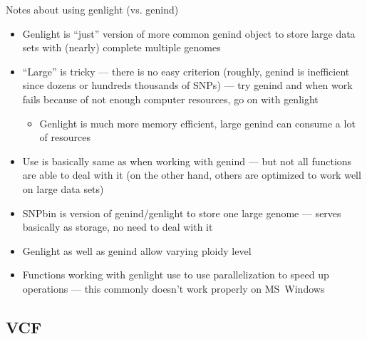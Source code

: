 \documentclass[compress, xelatex, 11pt, xcolor=svgnames, aspectratio=169, url={hyphens, lowtilde}]{beamer}
\begin{document}
\begin{frame}{Notes about using genlight (vs. genind)}
	\begin{itemize}
		\item Genlight is \enquote{just} version of more common genind object to store large data sets with (nearly) complete multiple genomes
		\item \enquote{Large} is tricky --- there is no easy criterion (roughly, genind is inefficient since dozens or hundreds thousands of SNPs) --- try genind and when work fails because of not enough computer resources, go on with genlight
		\begin{itemize}
			\item Genlight is much more memory efficient, large genind can consume a lot of resources
		\end{itemize}
		\item Use is basically same as when working with genind --- but not all functions are able to deal with it (on the other hand, others are optimized to work well on large data sets)
		\item SNPbin is version of genind/genlight to store one large genome --- serves basically as storage, no need to deal with it
		\item Genlight as well as genind allow varying ploidy level
		\item Functions working with genlight use to use parallelization to speed up operations --- this commonly doesn't work properly on MS~Windows
	\end{itemize}
\end{frame}

\subsection{VCF}
\end{document}
